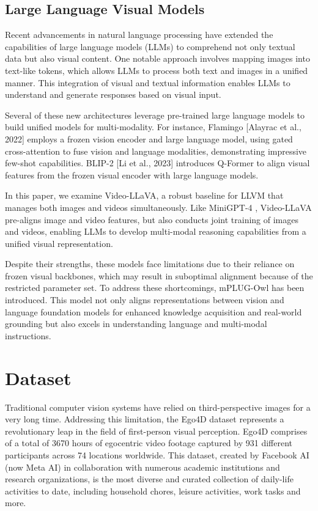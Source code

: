 \documentclass[10pt,twocolumn,letterpaper]{article}
\begin{document}
\subsection{Large Language Visual Models}
Recent advancements in natural language processing have extended the capabilities of large language models (LLMs) to comprehend not only textual data but also visual content. One notable approach involves mapping images into text-like tokens, which allows LLMs to process both text and images in a unified manner. This integration of visual and textual information enables LLMs to understand and generate responses based on visual input.

Several of these new architectures leverage pre-trained large language models to build unified models for multi-modality. For instance, Flamingo [Alayrac et al., 2022] employs a frozen vision encoder and large language model, using gated cross-attention to fuse vision and language modalities, demonstrating impressive few-shot capabilities. BLIP-2 [Li et al., 2023] introduces Q-Former to align visual features from the frozen visual encoder with large language models.

In this paper, we examine Video-LLaVA, a robust baseline for LLVM that manages both images and videos simultaneously. Like MiniGPT-4 \cite{b6}, Video-LLaVA pre-aligns image and video features, but also conducts joint training of images and videos, enabling LLMs to develop multi-modal reasoning capabilities from a unified visual representation.

Despite their strengths, these models face limitations due to their reliance on frozen visual backbones, which may result in suboptimal alignment because of the restricted parameter set. To address these shortcomings, mPLUG-Owl \cite{b7} has been introduced. This model not only aligns representations between vision and language foundation models for enhanced knowledge acquisition and real-world grounding but also excels in understanding language and multi-modal instructions.


\section{Dataset}
Traditional computer vision systems have relied on third-perspective images for a very long time. Addressing this limitation, the Ego4D dataset represents a revolutionary leap in the field of first-person visual perception. Ego4D comprises of a total of 3670 hours of egocentric video footage captured by 931 different participants across 74 locations worldwide. This dataset, created by Facebook AI (now Meta AI) in collaboration with numerous academic institutions and research organizations, is the most diverse and curated collection of daily-life activities to date, including household chores, leisure activities, work tasks and more. 
\end{document}

